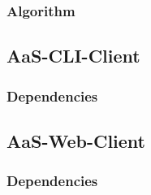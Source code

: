 \documentclass{scrartcl}
\begin{document}
\subsubsection{Algorithm}
\label{ssub:Algorithm}

\subsection{AaS-CLI-Client}
\label{sub:AaS-CLI-Client}

\subsubsection{Dependencies}
\label{ssub:CLI-Client-Dependencies}

\subsection{AaS-Web-Client}
\label{sub:AaS-Web-Client}

\subsubsection{Dependencies}
\label{ssub:Web-Client-Dependencies}
\end{document}
